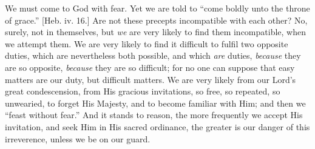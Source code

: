 We must come to God with fear. Yet we are told to ``come boldly
unto the throne of grace.'' [Heb. iv. 16.] Are not these precepts
incompatible with each other? No, surely, not in themselves, but \emph{we}
are very likely to find them incompatible, when we attempt them. We
are very likely to find it difficult to fulfil two opposite duties,
which are nevertheless both possible, and which \emph{are} duties, \emph{because}
they are so opposite, \emph{because} they are so difficult; for no one
can suppose that easy matters are our duty, but difficult matters. We
are very likely from our Lord's great condescension, from His gracious
invitations, so free, so repeated, so unwearied, to forget His
Majesty, and to become familiar with Him; and then we ``feast
without fear.'' And it stands to reason, the more frequently we
accept His invitation, and seek Him in His sacred ordinance, the
greater is our danger of this irreverence, unless we be on our guard.

